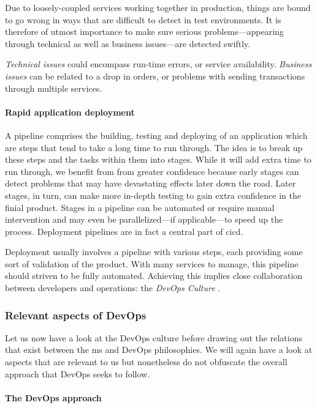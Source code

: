 Due to loosely-coupled services working together in production, things
are bound to go wrong in ways that are difficult to detect in test
environments. It is therefore of utmost importance to make sure
serious problems---appearing through technical as well as business
issues---are detected swiftly.

\textit{Technical issues} could encompass run-time errors, or service
availability. \textit{Business issues} can be related to a drop in orders, or
problems with sending transactions through multiple services.

\paragraph{Rapid application deployment}

A pipeline comprises the building, testing and deploying of an
application which are steps that tend to take a long time to run
through. The idea is to break up these steps and the tasks within them
into stages. While it will add extra time to run through, we benefit
from from greater confidence because early stages can detect problems
that may have devastating effects later down the road. Later stages,
in turn, can make more in-depth testing to gain extra confidence in
the finial product. Stages in a pipeline can be automated or require
manual intervention and may even be parallelized---if applicable---to
speed up the process. Deployment pipelines are in fact a central part
of \gls{cicd}. \cite{pipelines}

Deployment usually involves a pipeline with various steps, each
providing some sort of validation of the product.  With many services
to manage, this pipeline should striven to be fully automated.
Achieving this implies close collaboration between developers and
operations: the \textit{DevOps Culture} \cite{devops-culture}.

\subsubsection{Relevant aspects of DevOps}

Let us now have a look at the DevOps culture before drawing out the
relations that exist between the \gls{ms} and DevOps philosophies. We
will again have a look at aspects that are relevant to us but
nonetheless do not obfuscate the overall approach that DevOps
seeks to follow.

\paragraph{The DevOps approach}

